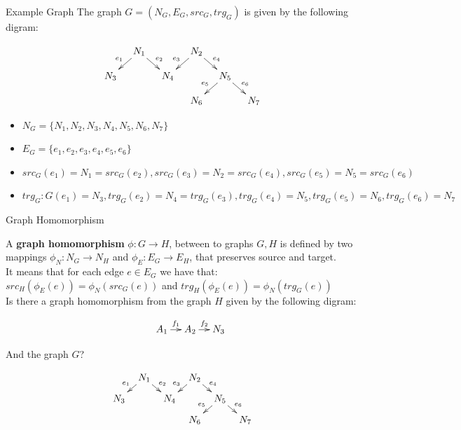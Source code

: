 \documentclass[slidetop,mathserif,red]{beamer}
\begin{document}
\begin{frame}{Example Graph}
The graph $G=(N_G,E_G,src_G,trg_G)$ is given by the following digram:

     \[\xymatrixrowsep{0.15in}
		\xymatrixcolsep{0.15in}
      \xymatrix{		& N_1 \ar[dl]_{e_1} \ar[dr]	^{e_2}	&& N_2 \ar[dl]_{e_3} \ar[dr]^{e_4}\\
      					N_3		&&  N_4	& 						& N_5 \ar[dl]_{e_5} \ar[dr]^{e_6}\\
      																&&& N_6			&&  N_7} \]
  \begin{itemize}
  \item $N_G = \{ N_1 ,  N_2 ,  N_3 ,  N_4 ,  N_5 ,  N_6 ,  N_7\}$ 
  \item $E_G =\{ e_1 ,  e_2 ,  e_3 ,  e_4 ,  e_5 ,  e_6 \}$
  \item $src_G(e_1) = N_1 = src_G( e_2),  src_G(e_3)=N_2 = src_G(e_4) ,  src_G(e_5) = N_5 =  src_G(e_6 ) $
  \item $trg_G:G(e_1) = N_3 , trg_G( e_2)=N_4 =   trg_G(e_3),  trg_G(e_4)=N_5 ,  trg_G(e_5) = N_6 ,  trg_G(e_6 ) = N_7$ 
  \end{itemize}

\end{frame}



\begin{frame}{Graph Homomorphism}

A \textbf{graph homomorphism} $\phi: G \to H$, between to graphs $G,H$ is defined by two mappings $\phi_N : N_G \to N_H$ and $\phi_E : E_G \to E_H$, that preserves source and target.\\
It means that for each edge $e \in E_G$ we have that: $src_H(\phi_E(e)) = \phi_N(src_G(e))$ and  $trg_H(\phi_E(e)) = \phi_N(trg_G(e))$\\


Is there a graph homomorphism from the graph $H$ given by the following digram:

     \[\xymatrixrowsep{0.15in}
		\xymatrixcolsep{0.15in}
		\xymatrix{		& A_1 \ar[r]^{f_1} 	& A_2 \ar[r]	^{f_2} & N_3 } \]
		
And the graph $G$?		
		
      \[\xymatrixrowsep{0.1in}
		\xymatrixcolsep{0.1in}
      \xymatrix{		& N_1 \ar[dl]_{e_1} \ar[dr]	^{e_2}	&& N_2 \ar[dl]_{e_3} \ar[dr]^{e_4}\\
      					N_3		&&  N_4	& 						& N_5 \ar[dl]_{e_5} \ar[dr]^{e_6}\\
      																&&& N_6			&&  N_7} \]
\end{frame}
\end{document}
